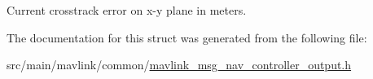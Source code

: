 Current crosstrack error on x-\/y plane in meters. 



The documentation for this struct was generated from the following file\+:\begin{DoxyCompactItemize}
\item 
src/main/mavlink/common/\hyperlink{mavlink__msg__nav__controller__output_8h}{mavlink\+\_\+msg\+\_\+nav\+\_\+controller\+\_\+output.\+h}\end{DoxyCompactItemize}
